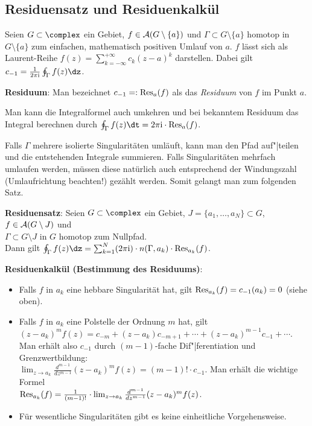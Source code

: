 \pagebreak

\subsection{%
    Residuensatz und Residuenkalkül%
}

Seien $G \subset \complex$ ein Gebiet, $f \in \mathcal{A}(G \setminus \{a\})$
und $\Gamma \subset G \setminus \{a\}$ homotop in $G \setminus \{a\}$ zum
einfachen, mathematisch positiven Umlauf von $a$.
$f$ lässt sich als Laurent-Reihe
$f(z) = \sum_{k=-\infty}^{+\infty} c_k (z - a)^k$
darstellen.
Dabei gilt $c_{-1} = \frac{1}{2\pi\i} \oint_\Gamma f(z)\dz$.

\textbf{Residuum}:
Man bezeichnet $c_{-1} =: \operatorname{Res}_a(f)$ als
das \emph{Residuum} von $f$ im Punkt $a$.

Man kann die Integralformel auch umkehren und bei bekanntem Residuum das
Integral berechnen durch
$\oint_\Gamma f(z)\dt = 2\pi\i \cdot \Res_a(f)$.

Falls $\Gamma$ mehrere isolierte Singularitäten umläuft, kann man den
Pfad auf"|teilen und die entstehenden Integrale summieren.
Falls Singularitäten mehrfach umlaufen werden, müssen diese natürlich auch
entsprechend der Windungszahl (Umlaufrichtung beachten!) gezählt werden.
Somit gelangt man zum folgenden Satz.

\textbf{Residuensatz}:
Seien $G \subset \complex$ ein Gebiet, $J = \{a_1, \dotsc, a_N\} \subset G$,
$f \in \mathcal{A}(G \setminus J)$ und\\
$\Gamma \subset G \setminus J$ in $G$ homotop zum Nullpfad.\\
Dann gilt $\oint_\Gamma f(z)\dz =
\sum_{k=1}^N (2\pi\i) \cdot n(\Gamma, a_k) \cdot \Res_{a_k}(f)$.

\linie

\textbf{Residuenkalkül (Bestimmung des Residuums)}:
\begin{itemize}
    \item
    Falls $f$ in $a_k$ eine hebbare Singularität hat, gilt
    $\operatorname{Res}_{a_k}(f) = c_{-1}(a_k) = 0$ (siehe oben).
    
    \item
    Falls $f$ in $a_k$ eine Polstelle der Ordnung $m$ hat, gilt\\
    $(z - a_k)^m f(z) =
    c_{-m} + (z - a_k) c_{-m+1} + \dotsb + (z - a_k)^{m-1} c_{-1} + \dotsb$.\\
    Man erhält also $c_{-1}$ durch $(m - 1)$-fache Dif"|ferentiation
    und Grenzwertbildung:\\
    $\lim_{z \to a_k} \frac{d^{m-1}}{dz^{m-1}} (z - a_k)^m f(z) =
    (m - 1)! \cdot c_{-1}$.
    Man erhält die wichtige Formel\\
    $\operatorname{Res}_{a_k}(f) = \frac{1}{(m - 1)!} \cdot
    \lim_{z \to a_k} \frac{d^{m-1}}{dz^{m-1}} (z - a_k)^m f(z)$.
    
    \item
    Für wesentliche Singularitäten gibt es keine einheitliche Vorgehensweise.
\end{itemize}

